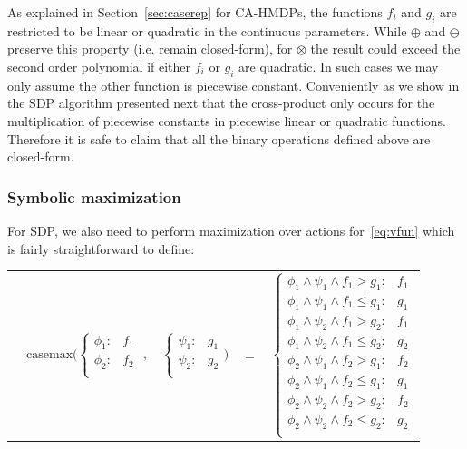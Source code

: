 \documentclass[twoside,11pt]{article}
\newcommand{\casemax}{\mathrm{casemax}}
\begin{document}
As explained in Section~\ref{sec:caserep} for CA-HMDPs, the functions $f_i$ and $g_i$ are restricted to be linear or quadratic in the continuous parameters. While $\oplus$ and $\ominus$ preserve this property (i.e. remain closed-form), for $\otimes$ the result could exceed the second order polynomial if either $f_i$ or $g_i$ are quadratic. In such cases we may only assume the other function is piecewise constant. Conveniently as we show in the SDP algorithm presented next that the cross-product only occurs for the multiplication of piecewise constants in piecewise linear or quadratic functions. Therefore it is safe to claim that all the binary operations defined above are closed-form.


\subsubsection*{Symbolic maximization}
For SDP, we also need to perform maximization over actions for~\eqref{eq:vfun} which is fairly straightforward
to define:

{%
\begin{center}
\begin{tabular}{r c c c l}
&
\hspace{-9mm} $\casemax \Bigg(
  \begin{cases}
    \phi_1: & f_1 \\ 
    \phi_2: & f_2 \\ 
  \end{cases}$
$,$
&
\hspace{-4mm}
  $\begin{cases}
    \psi_1: & g_1 \\ 
    \psi_2: & g_2 \\ 
  \end{cases} \Bigg)$
&
\hspace{-4mm} 
$ = $
&
\hspace{-4mm}
  $\begin{cases}
  \phi_1 \wedge \psi_1 \wedge f_1 > g_1    : & f_1 \\ 
  \phi_1 \wedge \psi_1 \wedge f_1 \leq g_1 : & g_1 \\ 
  \phi_1 \wedge \psi_2 \wedge f_1 > g_2    : & f_1 \\ 
  \phi_1 \wedge \psi_2 \wedge f_1 \leq g_2 : & g_2 \\ 
  \phi_2 \wedge \psi_1 \wedge f_2 > g_1    : & f_2 \\ 
  \phi_2 \wedge \psi_1 \wedge f_2 \leq g_1 : & g_1 \\ 
  \phi_2 \wedge \psi_2 \wedge f_2 > g_2    : & f_2 \\ 
  \phi_2 \wedge \psi_2 \wedge f_2 \leq g_2 : & g_2 \\ 
  \end{cases}$\label{symbolicMax}
\end{tabular}
\end{center}
}
\end{document}
